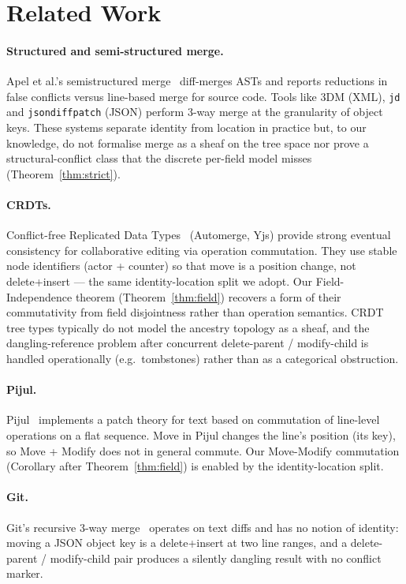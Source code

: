\documentclass[11pt,a4paper]{article}
\begin{document}
\section{Related Work}

\paragraph{Structured and semi-structured merge.} Apel et al.'s
semistructured merge~\cite{semistructured} diff-merges ASTs and reports
reductions in false conflicts versus line-based merge for source code.
Tools like 3DM (XML), \texttt{jd} and \texttt{jsondiffpatch} (JSON) perform
3-way merge at the granularity of object keys. These systems separate
identity from location in practice but, to our knowledge, do not formalise
merge as a sheaf on the tree space nor prove a structural-conflict class
that the discrete per-field model misses (Theorem~\ref{thm:strict}).

\paragraph{CRDTs.} Conflict-free Replicated Data Types~\cite{crdt}
(Automerge, Yjs) provide strong eventual consistency for collaborative
editing via operation commutation. They use stable node identifiers
(actor + counter) so that move is a position change, not delete+insert ---
the same identity-location split we adopt. Our Field-Independence theorem
(Theorem~\ref{thm:field}) recovers a form of their commutativity from
field disjointness rather than operation semantics. CRDT tree types
typically do not model the ancestry topology as a sheaf, and the
dangling-reference problem after concurrent delete-parent / modify-child
is handled operationally (e.g.\ tombstones) rather than as a categorical
obstruction.

\paragraph{Pijul.} Pijul~\cite{pijul} implements a patch theory for text
based on commutation of line-level operations on a flat sequence. Move in
Pijul changes the line's position (its key), so Move + Modify does not in
general commute. Our Move-Modify commutation (Corollary after
Theorem~\ref{thm:field}) is enabled by the identity-location split.

\paragraph{Git.} Git's recursive 3-way merge~\cite{git} operates on text
diffs and has no notion of identity: moving a JSON object key is a
delete+insert at two line ranges, and a delete-parent / modify-child pair
produces a silently dangling result with no conflict marker.
\end{document}
